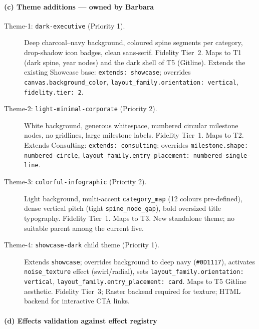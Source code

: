\paragraph{(c) Theme additions --- owned by Barbara}
\label{sec:target-gaps-theme}

\begin{description}
  \item[Theme-1: \texttt{dark-executive} (Priority 1).]
        Deep charcoal--navy background, coloured spine segments per category, drop-shadow
        icon badges, clean sans-serif. Fidelity Tier~2. Maps to T1 (dark spine, year
        nodes) and the dark shell of T5 (Gitline). Extends the existing Showcase base:
        \texttt{extends: showcase}; overrides \texttt{canvas.background\_color},
        \texttt{layout\_family.orientation: vertical}, \texttt{fidelity.tier: 2}.

  \item[Theme-2: \texttt{light-minimal-corporate} (Priority 2).]
        White background, generous whitespace, numbered circular milestone nodes, no
        gridlines, large milestone labels. Fidelity Tier~1. Maps to T2. Extends
        Consulting: \texttt{extends: consulting}; overrides
        \texttt{milestone.shape: numbered-circle},
        \texttt{layout\_family.entry\_placement: numbered-single-line}.

  \item[Theme-3: \texttt{colorful-infographic} (Priority 2).]
        Light background, multi-accent \texttt{category\_map} (12 colours pre-defined),
        dense vertical pitch (tight \texttt{spine\_node\_gap}), bold oversized title
        typography. Fidelity Tier~1. Maps to T3. New standalone theme; no suitable
        parent among the current five.

  \item[Theme-4: \texttt{showcase-dark} child theme (Priority 1).]
        Extends \texttt{showcase}; overrides background to deep navy (\texttt{\#0D1117}),
        activates \texttt{noise\_texture} effect (swirl/radial), sets
        \texttt{layout\_family.orientation: vertical},
        \texttt{layout\_family.entry\_placement: card}. Maps to T5 Gitline aesthetic.
        Fidelity Tier~3; Raster backend required for texture; HTML backend for
        interactive CTA links.
\end{description}

\paragraph{(d) Effects validation against effect registry}

